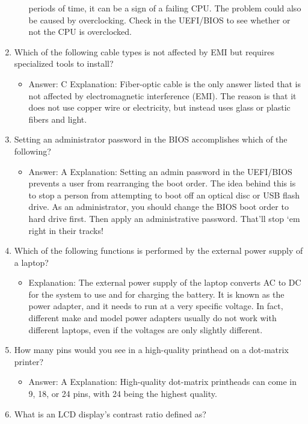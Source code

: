 \documentclass{article}
\begin{document}
\begin{enumerate}
\begin{itemize}
periods of time, it can be a sign of a failing CPU. The problem could also be caused
by overclocking. Check in the UEFI/BIOS to see whether or not the CPU is overclocked.
    \end{itemize}
    \item Which of the following cable types is not affected by EMI but
requires specialized tools to install?
    \begin{itemize}
        \item Answer: C
Explanation: Fiber-optic cable is the only answer listed that is not affected by electromagnetic
interference (EMI). The reason is that it does not use copper wire or electricity,
but instead uses glass or plastic fibers and light.
    \end{itemize}
    \item Setting an administrator password in the BIOS accomplishes
which of the following?
    \begin{itemize}
        \item Answer: A
Explanation: Setting an admin password in the UEFI/BIOS prevents a user from rearranging
the boot order. The idea behind this is to stop a person from attempting to
boot off an optical disc or USB flash drive. As an administrator, you should change the
BIOS boot order to hard drive first. Then apply an administrative password. That’ll stop
‘em right in their tracks!
    \end{itemize}
    \item Which of the following functions is performed by the external
power supply of a laptop?
    \begin{itemize}
        \item Explanation: The external power supply of the laptop converts AC to DC for the system
to use and for charging the battery. It is known as the power adapter, and it needs to
run at a very specific voltage. In fact, different make and model power adapters usually
do not work with different laptops, even if the voltages are only slightly different.
    \end{itemize}
    \item How many pins would you see in a high-quality printhead on a
dot-matrix printer?
    \begin{itemize}
        \item Answer: A
Explanation: High-quality dot-matrix printheads can come in 9, 18, or 24 pins, with 24
being the highest quality.
    \end{itemize}
    \item What is an LCD display’s contrast ratio defined as?

\end{enumerate}
\end{document}
